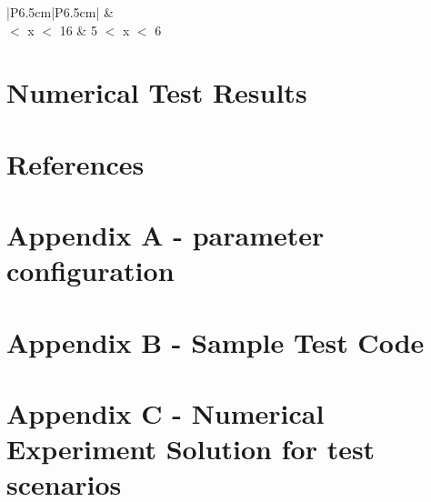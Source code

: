 \documentclass[11pt,letterpaper]{article}
\begin{document}
\begin{table}[H]
	\centering
	\caption{Test B-mix-1 Base Test Acceptance}
	\label{tab:test-B-mix-1base}
	\begin{tabular}{|P{6.5cm}|P{6.5cm}|}
		\hline
		\textbf{} &\textbf{}\\
		 $<$ x $<$ 16 & 5 $<$ x $<$ 6\\
		\hline
	\end{tabular}
\end{table}



\section{Numerical Test Results}


\section{References}


\section*{Appendix A - parameter configuration}

\section*{Appendix B - Sample Test Code }

\section*{Appendix C - Numerical Experiment Solution for test scenarios}
\end{document}

